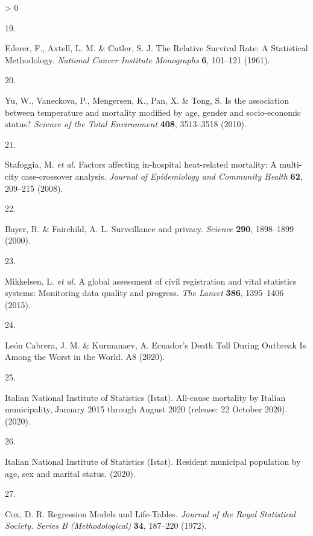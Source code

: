 \documentclass[
]{article}
\newlength{\cslhangindent}
\newlength{\csllabelwidth}
\newenvironment{CSLReferences}[2] %
 {%
  \setlength{\parindent}{0pt}
  \ifodd #1 \everypar{\setlength{\hangindent}{\cslhangindent}}\ignorespaces\fi
  \ifnum #2 > 0
  \setlength{\parskip}{#2\baselineskip}
  \fi
 }%
 {}
\newcommand{\CSLLeftMargin}[1]{\parbox[t]{\csllabelwidth}{#1}}
\newcommand{\CSLRightInline}[1]{\parbox[t]{\linewidth - \csllabelwidth}{#1}\break}
\begin{document}
\begin{CSLReferences}{0}{0}
\leavevmode\hypertarget{ref-Ederer1961}{}%
\CSLLeftMargin{19. }
\CSLRightInline{Ederer, F., Axtell, L. M. \& Cutler, S. J. {The Relative Survival Rate: A Statistical Methodology}. \emph{National Cancer Institute Monographs} \textbf{6}, 101--121 (1961).}

\leavevmode\hypertarget{ref-Yu2010}{}%
\CSLLeftMargin{20. }
\CSLRightInline{Yu, W., Vaneckova, P., Mengersen, K., Pan, X. \& Tong, S. {Is the association between temperature and mortality modified by age, gender and socio-economic status?} \emph{Science of the Total Environment} \textbf{408}, 3513--3518 (2010).}

\leavevmode\hypertarget{ref-Stafoggia2008}{}%
\CSLLeftMargin{21. }
\CSLRightInline{Stafoggia, M. \emph{et al.} {Factors affecting in-hospital heat-related mortality: A multi-city case-crossover analysis}. \emph{Journal of Epidemiology and Community Health} \textbf{62}, 209--215 (2008).}

\leavevmode\hypertarget{ref-Bayer2000}{}%
\CSLLeftMargin{22. }
\CSLRightInline{Bayer, R. \& Fairchild, A. L. {Surveillance and privacy}. \emph{Science} \textbf{290}, 1898--1899 (2000).}

\leavevmode\hypertarget{ref-Mikkelsen2015}{}%
\CSLLeftMargin{23. }
\CSLRightInline{Mikkelsen, L. \emph{et al.} {A global assessment of civil registration and vital statistics systems: Monitoring data quality and progress}. \emph{The Lancet} \textbf{386}, 1395--1406 (2015).}

\leavevmode\hypertarget{ref-LeonCabrera2020}{}%
\CSLLeftMargin{24. }
\CSLRightInline{León Cabrera, J. M. \& Kurmanaev, A. {Ecuador's Death Toll During Outbreak Is Among the Worst in the World}. A8 (2020).}

\leavevmode\hypertarget{ref-ItalianNationalInstituteofStatisticsIstat2020a}{}%
\CSLLeftMargin{25. }
\CSLRightInline{Italian National Institute of Statistics (Istat). {All-cause mortality by Italian municipality, January 2015 through August 2020 (release: 22 October 2020).} (2020).}

\leavevmode\hypertarget{ref-ItalianNationalInstituteofStatisticsIstat2020}{}%
\CSLLeftMargin{26. }
\CSLRightInline{Italian National Institute of Statistics (Istat). {Resident municipal population by age, sex and marital status}. (2020).}

\leavevmode\hypertarget{ref-Cox1972}{}%
\CSLLeftMargin{27. }
\CSLRightInline{Cox, D. R. {Regression Models and Life-Tables}. \emph{Journal of the Royal Statistical Society. Series B (Methodological)} \textbf{34}, 187--220 (1972).}


\end{CSLReferences}
\end{document}
